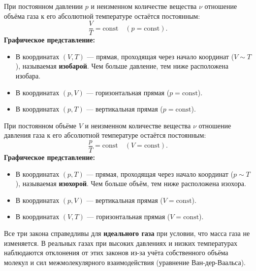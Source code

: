 \begin{theorem}
При постоянном давлении $p$ и неизменном количестве вещества $\nu$ отношение объёма газа к его абсолютной температуре остаётся постоянным:
\begin{equation}
    \frac{V}{T} = \text{const} \quad (p = \text{const}). \label{eq:gay_lussac_37}
\end{equation}
\textbf{Графическое представление:}
\begin{itemize}
    \item В координатах $(V, T)$ --- прямая, проходящая через начало координат ($V \sim T$), называемая \textbf{изобарой}. Чем больше давление, тем ниже расположена изобара.
    \item В координатах $(p, V)$ --- горизонтальная прямая ($p = \text{const}$).
    \item В координатах $(p, T)$ --- вертикальная прямая ($p = \text{const}$).
\end{itemize}
\end{theorem}

\begin{theorem}
При постоянном объёме $V$ и неизменном количестве вещества $\nu$ отношение давления газа к его абсолютной температуре остаётся постоянным:
\begin{equation}
    \frac{p}{T} = \text{const} \quad (V = \text{const}). \label{eq:charles_37}
\end{equation}
\textbf{Графическое представление:}
\begin{itemize}
    \item В координатах $(p, T)$ --- прямая, проходящая через начало координат ($p \sim T$), называемая \textbf{изохорой}. Чем больше объём, тем ниже расположена изохора.
    \item В координатах $(p, V)$ --- вертикальная прямая ($V = \text{const}$).
    \item В координатах $(V, T)$ --- горизонтальная прямая ($V = \text{const}$).
\end{itemize}
\end{theorem}

\begin{remark}
Все три закона справедливы для \textbf{идеального газа} при условии, что масса газа не изменяется. В реальных газах при высоких давлениях и низких температурах наблюдаются отклонения от этих законов из-за учёта собственного объёма молекул и сил межмолекулярного взаимодействия (уравнение Ван-дер-Ваальса).
\end{remark}


